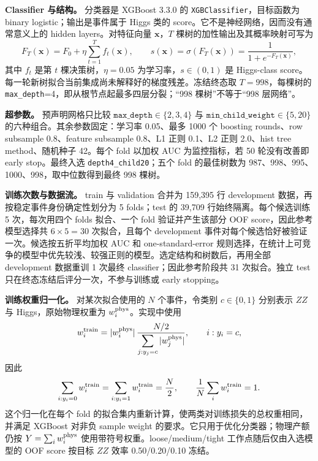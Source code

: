 \documentclass[11pt,a4paper,fontset=none]{ctexart}
\begin{document}
\textbf{Classifier 与结构。} 分类器是 XGBoost 3.3.0 的 \texttt{XGBClassifier}，目标函数为 binary logistic；输出是事件属于 Higgs 类的 score。它不是神经网络，因而没有通常意义上的 hidden layers。对特征向量 $\mathbf{x}$，$T$ 棵树的加性输出及其概率映射可写为
\begin{equation}
F_T(\mathbf{x})=F_0+\eta\sum_{t=1}^{T}f_t(\mathbf{x}),
\qquad
s(\mathbf{x})=\sigma\!\left(F_T(\mathbf{x})\right)
=\frac{1}{1+e^{-F_T(\mathbf{x})}},
\end{equation}
其中 $f_t$ 是第 $t$ 棵决策树，$\eta=0.05$ 为学习率，$s\in(0,1)$ 是 Higgs-class score。每一轮新树拟合当前集成尚未解释好的梯度残差。冻结终态取 $T=998$，每棵树的 \texttt{max\_depth}=4，即从根节点起最多四层分裂；“998 棵树”不等于“998 层网络”。

\textbf{超参数。} 预声明网格只比较 $\texttt{max\_depth}\in\{2,3,4\}$ 与 $\texttt{min\_child\_weight}\in\{5,20\}$ 的六种组合。其余参数固定：学习率 0.05、最多 1000 个 boosting rounds、row subsample 0.8、feature subsample 0.8、L1 正则 0.1、L2 正则 2.0、hist tree method、随机种子 42。每个 fold 以加权 AUC 为监控指标，若 50 轮没有改善即 early stop。最终入选 \texttt{depth4\_child20}；五个 fold 的最佳树数为 987、998、995、1000、998，取中位数得到最终 998 棵树。

\textbf{训练次数与数据流。} train 与 validation 合并为 159,395 行 development 数据，再按稳定事件身份确定性划分为 5 folds；test 的 39,709 行始终隔离。每个候选训练 5 次，每次用四个 folds 拟合、一个 fold 验证并产生该部分 OOF score，因此参考模型选择共 $6\times5=30$ 次拟合，且每个 development 事件对每个候选恰好被验证一次。候选按五折平均加权 AUC 和 one-standard-error 规则选择，在统计上可竞争的模型中优先较浅、较强正则的模型。选定结构和树数后，再用全部 development 数据重训 1 次最终 classifier；因此参考阶段共 31 次拟合。独立 test 只在终态冻结后评分一次，不参与训练或 early stopping。

\textbf{训练权重归一化。} 对某次拟合使用的 $N$ 个事件，令类别 $c\in\{0,1\}$ 分别表示 $ZZ$ 与 Higgs，原始物理权重为 $w_i^{\rm phys}$。实现中使用
\begin{equation}
w_i^{\rm train}
=|w_i^{\rm phys}|\,
\frac{N/2}{\displaystyle\sum_{j:y_j=c}|w_j^{\rm phys}|},
\qquad i:y_i=c,
\end{equation}
因此
\begin{equation}
\sum_{i:y_i=0}w_i^{\rm train}
=\sum_{i:y_i=1}w_i^{\rm train}=\frac{N}{2},
\qquad
\frac{1}{N}\sum_i w_i^{\rm train}=1.
\end{equation}
这个归一化在每个 fold 的拟合集内重新计算，使两类对训练损失的总权重相同，并满足 XGBoost 对非负 sample weight 的要求。它只用于优化分类器；物理产额仍按 $Y=\sum_i w_i^{\rm phys}$ 使用带符号权重。loose/medium/tight 工作点随后仅由入选模型的 OOF score 按目标 $ZZ$ 效率 0.50/0.20/0.10 冻结。
\end{document}
